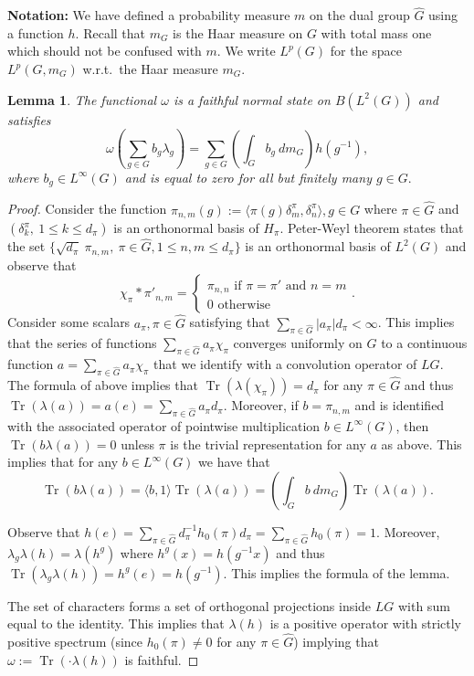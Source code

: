 \documentclass[a4paper,12pt]{amsart}
\numberwithin{equation}{section}
\newtheorem{lemma}[theo]{Lemma}
\theoremstyle{definition}
\newcommand{\la}{\lambda}
\DeclareMathOperator{\Tr}{Tr}
\newcommand{\wh}{\widehat}
\begin{document}
{\bf Notation:} We have defined a probability measure $m$ on the dual group $\wh G$ using a function $h$. Recall that $m_G$ is the Haar measure on $G$ with total mass one which should not be confused with $m$. We write $L^p(G)$ for the space $L^p(G,m_G)$ w.r.t.~the Haar measure $m_G$.%

\begin{lemma}\label{lem:omega}
The functional $\omega$ is a faithful normal state on $B(L^2(G))$ and satisfies
$$\omega \left( \sum_{g\in G} b_g \la_g \right) = \sum_{g\in G} \left( \int_G b_g\ dm_G \right) h(g^{-1}),$$
where $b_g\in L^\infty(G)$ and is equal to zero for all but finitely many $g\in G.$ 
\end{lemma}

\begin{proof}
Consider the function $\pi_{n,m}(g) := \langle \pi(g) \delta_m^\pi , \delta_n^\pi\rangle, g\in G$ where $\pi\in\wh G$ and $(\delta_k^\pi,\ 1\leq k\leq d_\pi)$ is an orthonormal basis of $H_\pi.$
Peter-Weyl theorem states that the set $\{ \sqrt{ d_\pi}\ \pi_{n,m} ,\ \pi\in \wh G, 1\leq n,m\leq d_\pi\}$ is an orthonormal basis of $L^2(G)$ and observe that $$\chi_\pi * \pi'_{n,m} = \begin{cases} \pi_{n,n} \text{ if } \pi=\pi' \text{ and } n=m\\ 0 \text{ otherwise } \end{cases} .$$
Consider some scalars $a_\pi, \pi\in\wh G$ satisfying that $\sum_{\pi\in\wh G} | a_\pi | d_\pi <\infty$.
This implies that the series of functions $\sum_{\pi\in\wh G} a_\pi \chi_\pi$ converges uniformly on $G$ to a continuous function $a=\sum_{\pi\in\wh G} a_\pi \chi_\pi$ that we identify with a convolution operator of $LG.$
The formula of above implies that $\Tr(\la(\chi_\pi)) = d_\pi$ for any $\pi\in\wh G$ and thus $\Tr(\la(a)) = a(e) = \sum_{\pi\in\wh G} a_\pi d_\pi$.
Moreover, if $b=\pi_{n,m}$ and is identified with the associated operator of pointwise multiplication $b\in L^\infty(G)$, then $\Tr(b \la(a)) =0$ unless $\pi$ is the trivial representation for any $a$ as above.
This implies that for any $b\in L^\infty(G)$ we have that 
$$\Tr(b \la(a)) = \langle b, 1\rangle \Tr(\la(a)) = \left( \int_G b \ dm_G\right) \Tr(\la(a)).$$

Observe that $h(e) = \sum_{\pi\in\wh G} d_\pi^{-1} h_0(\pi) d_\pi = \sum_{\pi\in\wh G} h_0(\pi) = 1$. 
Moreover, $\la_g\la(h) = \la(h^g)$ where $h^g(x) = h(g^{-1} x)$ and thus $\Tr(\la_g \la(h)) = h^g(e) = h(g^{-1})$.
This implies the formula of the lemma.

The set of characters forms a set of orthogonal projections inside $LG$ with sum equal to the identity.
This implies that $\la(h)$ is a positive operator with strictly positive spectrum (since $h_0(\pi)\neq 0$ for any $\pi\in\wh G$) implying that $\omega:=\Tr(\cdot \la(h))$ is faithful.
\end{proof}
\end{document}
